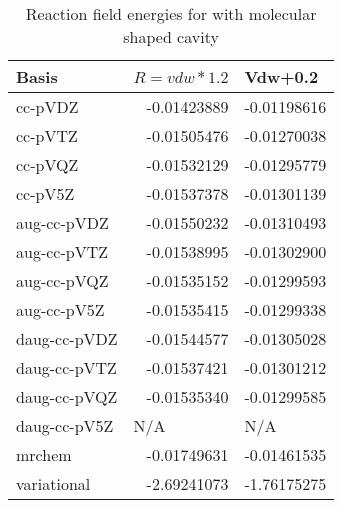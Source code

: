 \documentclass[../master_thesis.tex]{subfiles}
\begin{document}
\begin{table}[htbp]
\caption{Reaction field  energies for  with molecular shaped cavity}
\begin{tabular}{l|r|r}
Basis & \multicolumn{1}{l|}{$R = vdw*1.2$} & \multicolumn{1}{l|}{Vdw+0.2} \\ \hline
cc-pVDZ & -0.01423889 & -0.01198616 \\
cc-pVTZ & -0.01505476 & -0.01270038 \\
cc-pVQZ & -0.01532129 & -0.01295779 \\
cc-pV5Z & -0.01537378 & -0.01301139 \\ \hline
aug-cc-pVDZ & -0.01550232 & -0.01310493 \\
aug-cc-pVTZ & -0.01538995 & -0.01302900 \\
aug-cc-pVQZ & -0.01535152 & -0.01299593 \\
aug-cc-pV5Z & -0.01535415 & -0.01299338 \\ \hline
daug-cc-pVDZ & -0.01544577 & -0.01305028 \\
daug-cc-pVTZ & -0.01537421 & -0.01301212 \\
daug-cc-pVQZ & -0.01535340 & -0.01299585 \\
daug-cc-pV5Z & \multicolumn{1}{l|}{N/A} & \multicolumn{1}{l|}{N/A} \\ \hline
mrchem & -0.01749631 & -0.01461535 \\
variational & -2.69241073 & -1.76175275 \\ 
\end{tabular}
\label{tab:abcEracetamid}
\end{table}


\biblio
\end{document}
